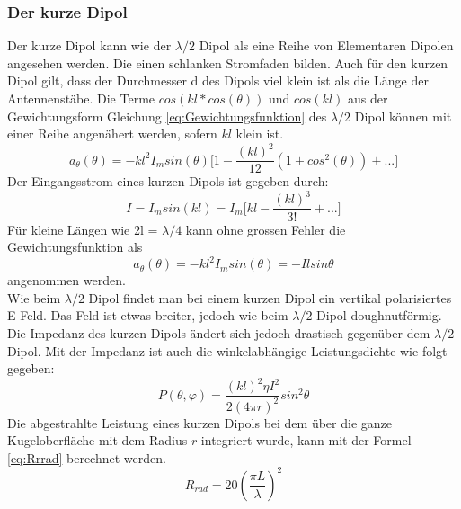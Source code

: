\newpage
\subsubsection{Der kurze Dipol }\label{sec:kurzerDipol}
Der kurze Dipol kann wie der $\lambda /2$ Dipol als eine Reihe von Elementaren Dipolen angesehen werden. Die einen schlanken Stromfaden bilden. Auch für den kurzen Dipol gilt, dass der Durchmesser d des Dipols viel klein ist als die Länge der Antennenstäbe. 
Die Terme $cos(kl*cos(\theta)) $ und $cos(kl)$ aus der Gewichtungsform Gleichung \ref{eq:Gewichtungsfunktion}
 des $\lambda/2$ Dipol können mit einer Reihe angenähert werden, sofern $kl$ klein ist.
\begin{equation}
a_{\theta}(\theta)=-kl^{2}I_{m}sin(\theta) \lbrack 1- \frac{(kl)^{2}}{12}(1+cos^{2}(\theta))+...\rbrack
\end{equation}
Der Eingangsstrom eines kurzen Dipols ist gegeben durch:
\begin{equation}
I=I_{m}sin(kl)=I_{m}\lbrack kl - \frac{(kl)^{3}}{3!} +... \rbrack
\end{equation}
 Für kleine Längen wie 2l = $\lambda/4 $ kann ohne grossen Fehler die Gewichtungsfunktion als 
\begin{equation}
a_{\theta}(\theta)=-kl^{2}I_{m}sin(\theta)=-Ilsin\theta
\end{equation}
angenommen werden.\\
Wie beim $\lambda/2$ Dipol findet man bei einem kurzen Dipol ein vertikal polarisiertes E Feld. Das Feld ist etwas breiter,  jedoch wie beim $\lambda/2$ Dipol doughnutförmig. Die Impedanz des kurzen Dipols ändert sich jedoch drastisch gegenüber dem $\lambda/2$ Dipol. Mit der Impedanz ist auch die winkelabhängige Leistungsdichte wie folgt gegeben:
\begin{equation}
P(\theta,\varphi)=\frac{(kl)^{2}\eta I^{2}}{2(4\pi r)^{2}}sin^{2}\theta
\end{equation}
Die abgestrahlte Leistung eines kurzen Dipols bei dem über die ganze Kugeloberfläche mit dem Radius $r$ integriert wurde, kann mit der Formel \ref{eq:Rrrad} berechnet werden.
\begin{equation}\label{eq:Rrrad}
R_{rad}=20 \left(\frac{\pi L}{\lambda} \right) ^{2}
\end{equation}



